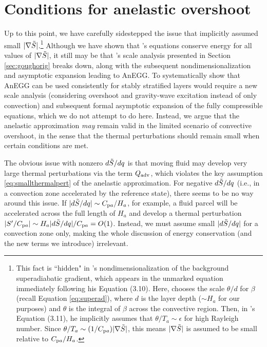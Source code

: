 \documentclass[12pt]{article}
\newcommand{\heatadv}{Q_{\rm adv}}
\newcommand{\cpa}{C_{{\rm p}a}}
\begin{document}
\section{Conditions for anelastic overshoot}\label{sec:overshoot}
Up to this point, we have carefully sidestepped the issue that \citet{Gough1969} implicitly assumed small $|\nabla \tilde{S}|$.\footnote{This fact is ``hidden" in \citet{Gough1969}'s nondimensionalization of the background superadiabatic gradient, which appears in the unmarked equation immediately following his Equation (3.10). Here, \citet{Gough1969} chooses the scale $\theta/d$ for $\beta$ (recall Equation \eqref{eq:superad}), where $d$ is the layer depth ($\sim$$H_a$ for our purposes) and $\theta$ is the integral of $\beta$ across the convective region. Then, in \citet{Gough1969}'s Equation (3.11), he implicitly assumes that $\theta/T_a\sim\epsilon$ for high Rayleigh number. Since $\theta/T_a\sim (1/\cpa)|\nabla\entrtilde|$, this means $|\nabla\tilde{S}|$ is assumed to be small relative to $\cpa/H_a$.} Although we have shown that \citet{Gough1969}'s equations conserve energy for all values of $|\nabla \tilde{S}|$, it still may be that \citet{Gough1969}'s scale analysis presented in Section \ref{sec:goughorig} breaks down, along with the subsequent nondimensionalization and asymptotic expansion leading to AnEGG. To systematically show that AnEGG can be used consistently for stably stratified layers would require a new scale analysis (considering overshoot and gravity-wave excitation instead of only convection) and subsequent formal asymptotic expansion of the fully compressible equations, which we do not attempt to do here. Instead, we argue that the anelastic approximation \textit{may} remain valid in the limited scenario of convective overshoot, in the sense that the thermal perturbations should remain small when certain conditions are met. %

The obvious issue with nonzero $d\tilde{S}/dq$ is that moving fluid may develop very large thermal perturbations via the term $\heatadv$, which violates the key assumption \eqref{eq:smallthermalpert} of the anelastic approximation. For negative $d\tilde{S}/dq$ (i.e., in a convection zone accelerated by the reference state), there seems to be no way around this issue. If $|d\entrtilde/dq|\sim \cpa/H_a$, for example, a fluid parcel will be accelerated across the full length of $H_a$ and develop a thermal perturbation $|\entrprime/\cpa|\sim H_a|d\entrtilde/dq|/\cpa=O(1)$. Instead, we must assume small $|d\tilde{S}/dq|$ for a convection zone only, making the whole discussion of energy conservation (and the new terms we introduce) irrelevant. 
\end{document}
